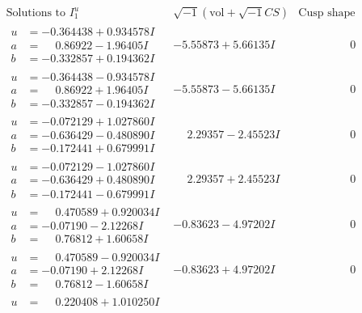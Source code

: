 \documentclass[1p]{elsarticle_modified}
\theoremstyle{definition}
\newcommand{\I}{\sqrt{-1}}
\begin{document}
$$\begin{array}{c|c|c}  
\text{Solutions to }I^u_{1}& \I (\text{vol} + \sqrt{-1}CS) & \text{Cusp shape}\\
 \hline 
\begin{aligned}
u &= -0.364438 + 0.934578 I \\
a &= \phantom{-}0.86922 - 1.96405 I \\
b &= -0.332857 + 0.194362 I\end{aligned}
 & -5.55873 + 5.66135 I & \phantom{-0.000000 } 0 \\ \hline\begin{aligned}
u &= -0.364438 - 0.934578 I \\
a &= \phantom{-}0.86922 + 1.96405 I \\
b &= -0.332857 - 0.194362 I\end{aligned}
 & -5.55873 - 5.66135 I & \phantom{-0.000000 } 0 \\ \hline\begin{aligned}
u &= -0.072129 + 1.027860 I \\
a &= -0.636429 - 0.480890 I \\
b &= -0.172441 + 0.679991 I\end{aligned}
 & \phantom{-}2.29357 - 2.45523 I & \phantom{-0.000000 } 0 \\ \hline\begin{aligned}
u &= -0.072129 - 1.027860 I \\
a &= -0.636429 + 0.480890 I \\
b &= -0.172441 - 0.679991 I\end{aligned}
 & \phantom{-}2.29357 + 2.45523 I & \phantom{-0.000000 } 0 \\ \hline\begin{aligned}
u &= \phantom{-}0.470589 + 0.920034 I \\
a &= -0.07190 - 2.12268 I \\
b &= \phantom{-}0.76812 + 1.60658 I\end{aligned}
 & -0.83623 - 4.97202 I & \phantom{-0.000000 } 0 \\ \hline\begin{aligned}
u &= \phantom{-}0.470589 - 0.920034 I \\
a &= -0.07190 + 2.12268 I \\
b &= \phantom{-}0.76812 - 1.60658 I\end{aligned}
 & -0.83623 + 4.97202 I & \phantom{-0.000000 } 0 \\ \hline\begin{aligned}
u &= \phantom{-}0.220408 + 1.010250 I \\

\end{aligned}
\end{array}$$
\end{document}
